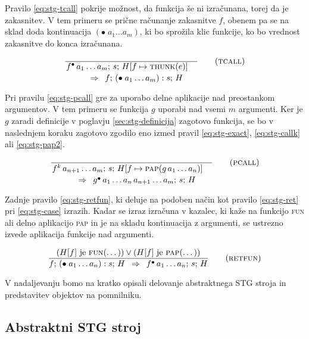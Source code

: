 Pravilo \ref{eq:stg-tcall} pokrije možnost, da funkcija še ni izračunana, torej da je zakasnitev. V tem primeru se prične računanje zakasnitve $f$, obenem pa se na sklad doda kontinuacija $(\bullet \; a_1 \dots a_m)$, ki bo sprožila klic funkcije, ko bo vrednost zakasnitve do konca izračunana.

\begin{equation}
	\linfer[tcall]{}{
		f^\bullet \, a_1 \dots a_m ; \, s; \, H[f \mapsto \textsc{thunk}(e)]
	}{
		f; \, (\bullet \; a_1 \dots a_m) : s; \, H
	}
\label{eq:stg-tcall}
\end{equation}

Pri pravilu \ref{eq:stg-pcall} gre za uporabo delne aplikacije nad preostankom argumentov. V tem primeru se funkcija $g$ uporabi nad vsemi $m$ argumenti. Ker je $g$ zaradi definicije v poglavju \ref{sec:stg-definicija} zagotovo funkcija, se bo v naslednjem koraku zagotovo zgodilo eno izmed pravil \ref{eq:stg-exact}, \ref{eq:stg-callk} ali \ref{eq:stg-pap2}.

\begin{equation}
	\linfer[pcall]{}{
		f^k \, a_{n + 1} \dots a_m ; \, s; \, H[f \mapsto \textsc{pap}(g \, a_1 \dots a_n)]
	}{
		g^\bullet \, a_1 \dots a_n \, a_{n + 1} \dots a_m; \, s; \, H
	}
\label{eq:stg-pcall}
\end{equation}

Zadnje pravilo \ref{eq:stg-retfun}, ki deluje na podoben način kot pravilo \ref{eq:stg-ret} pri \ref{eq:stg-case} izrazih. Kadar se izraz izračuna v kazalec, ki kaže na funkcijo \textsc{fun} ali delno aplikacijo \textsc{pap} in je na skladu kontinuacija z argumenti, se ustrezno izvede aplikacija funkcije nad argumenti.

\begin{equation}
	\infer[retfun]{
		(\text{$H[f]$ je \textsc{fun}(\dots)}) \lor (\text{$H[f]$ je \textsc{pap}(\dots)})
	}{
		f; \, (\bullet \; a_1 \dots a_n) : s; \, H
	}{
		f^\bullet \, a_1 \dots a_n; \, s; \, H
	}
\label{eq:stg-retfun}
\end{equation}

V nadaljevanju bomo na kratko opisali delovanje abstraktnega STG stroja in predstavitev objektov na pomnilniku.

\subsection{Abstraktni STG stroj}
\label{sec:abstraktni-stg-stroj}


